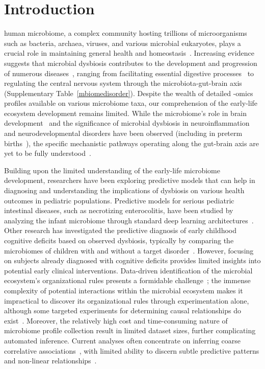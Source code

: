 \documentclass[onecolumn,10pt]{IEEEtran}
\def\EXTENDEDDATA{Supplementary\xspace}
\begin{document}
\section*{Introduction}

 human microbiome, a complex community hosting trillions of microorganisms such as bacteria, archaea, viruses, and various microbial eukaryotes, plays a crucial role in maintaining general health and homeostasis~\cite{cryan2012mind,pmid26947798}. Increasing evidence suggests that microbial dysbiosis contributes to the development and progression of numerous diseases~\cite{pmid25928420}, ranging from facilitating essential digestive processes~\cite{pmid30680646} to regulating the central nervous system through the microbiota-gut-brain axis~\cite{burokas2015microbiota,lu2018microbiota} (\EXTENDEDDATA Table~\ref{mbiomedisorder}). Despite the wealth of detailed -omics profiles available on various microbiome taxa, our comprehension of the early-life ecosystem development remains limited. While the microbiome's role in brain development~\cite{lu2018microbiota} and the significance of microbial dysbiosis in neuroinflammation and neurodevelopmental disorders have been observed (including in preterm births~\cite{lu2019connection,kang2013,hsiao2013}), the specific mechanistic pathways operating along the gut-brain axis are yet to be fully understood~\cite{oliphant2021bacteroidota}.

Building upon the limited understanding of the early-life microbiome development, researchers have been exploring predictive models that can help in diagnosing and understanding the implications of dysbiosis on various health outcomes in pediatric populations. Predictive models for serious pediatric intestinal diseases, such as necrotizing enterocolitis, have been studied by analyzing the infant microbiome through standard deep learning architectures~\cite{hooven2020multiple,olm2019necrotizing}. Other research has investigated the predictive diagnosis of early childhood cognitive deficits based on observed dysbiosis, typically by comparing the microbiomes of children with and without a target disorder~\cite{laue2020prospective}. However, focusing on subjects already diagnosed with cognitive deficits provides limited insights into potential early clinical interventions. Data-driven identification of the microbial ecosystem's organizational rules presents a formidable challenge~\cite{matchado2021network}; the immense complexity of potential interactions within the microbial ecosystem makes it impractical to discover its organizational rules through experimentation alone, although some targeted experiments for determining causal relationships do exist~\cite{fischbach2018microbiome}. Moreover, the relatively high cost and time-consuming nature of microbiome profile collection result in limited dataset sizes, further complicating automated inference.  Current analyses often concentrate on inferring coarse correlative associations~\cite{faust2016conet,deng2012molecular,friedman2012inferring}, with limited ability to discern subtle predictive patterns and non-linear relationships~\cite{fang2015cclasso,ban2015investigating}. 
\end{document}
